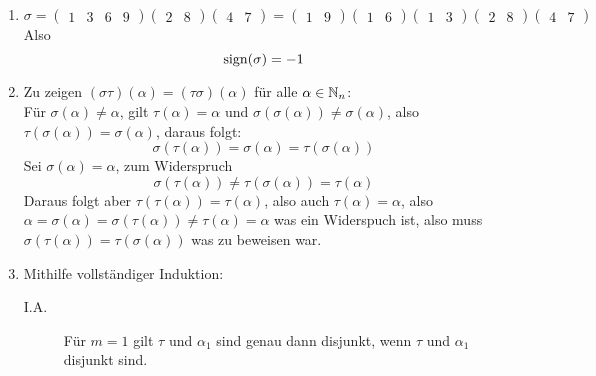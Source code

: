 \documentclass[sectionformat = aufgabe]{gadsescript}
\begin{document}
\maketitle
\setcounter{section}{6}
\subsection{}
\begin{enumerate}[label=(\alph*)]
	\item 
		\[
			\sigma = \begin{pmatrix} 1 & 3 & 6 & 9 \end{pmatrix} \begin{pmatrix} 2 & 8 \end{pmatrix} \begin{pmatrix} 4 & 7 \end{pmatrix} = \begin{pmatrix} 1 & 9 \end{pmatrix} \begin{pmatrix} 1 & 6 \end{pmatrix} \begin{pmatrix} 1 & 3 \end{pmatrix} \begin{pmatrix} 2 & 8 \end{pmatrix} \begin{pmatrix} 4 & 7 \end{pmatrix} 
		\]
		Also
		\[
			\operatorname{sign} ( \sigma ) = - 1
		\]
	\item Zu zeigen $ (\sigma \tau) (\alpha) = (\tau \sigma) (\alpha) $ für alle $ \alpha \in \mathbb{N} _n $:\\
		Für $ \sigma (\alpha) \neq \alpha $, gilt $ \tau (\alpha) = \alpha $ und $ \sigma( \sigma (\alpha)) \neq \sigma (\alpha) $, also $ \tau ( \sigma (\alpha)) = \sigma (\alpha) $, daraus folgt:
		\[
			\sigma( \tau (\alpha)) = \sigma(\alpha) = \tau(\sigma(\alpha))
		\]
		Sei $ \sigma (\alpha) = \alpha $, zum Widerspruch
		\[
			\sigma(\tau(\alpha)) \neq \tau (\sigma(\alpha)) = \tau(\alpha)
		\]
		Daraus folgt aber $ \tau (\tau (\alpha)) = \tau(\alpha)$, also auch $ \tau (\alpha) = \alpha $, also $ \alpha = \sigma(\alpha) = \sigma(\tau(\alpha)) \neq \tau(\alpha) = \alpha $ was ein Widerspuch ist, also muss $ \sigma(\tau(\alpha)) = \tau(\sigma(\alpha)) $ was zu beweisen war.
	\item Mithilfe vollständiger Induktion:
		\begin{description}
			\item[I.A.] 
				Für $ m = 1 $ gilt $ \tau $ und $ \alpha_1 $ sind genau dann disjunkt, wenn $ \tau $ und $ \alpha_1 $ disjunkt sind.

\end{description}
\end{enumerate}
\end{document}
